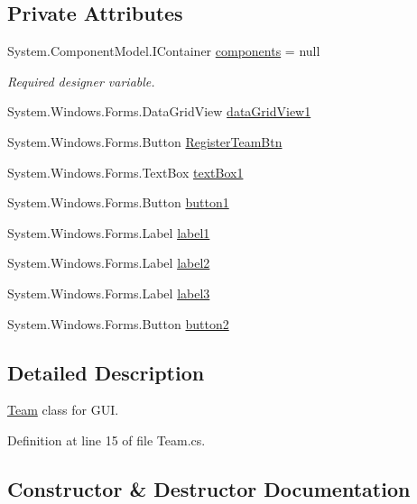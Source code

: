 \subsection*{Private Attributes}
\begin{DoxyCompactItemize}
\item 
System.\+Component\+Model.\+I\+Container \hyperlink{classPCO_1_1__0_1_1TeamForm_ab5e42668f793e518fe0615bc55ed7cb7}{components} = null
\begin{DoxyCompactList}\small\item\em Required designer variable. \end{DoxyCompactList}\item 
System.\+Windows.\+Forms.\+Data\+Grid\+View \hyperlink{classPCO_1_1__0_1_1TeamForm_a8c2297c2bcd76960ace971955c22284f}{data\+Grid\+View1}
\item 
System.\+Windows.\+Forms.\+Button \hyperlink{classPCO_1_1__0_1_1TeamForm_a77ddf05e8808fb4acf9c781dd7ac1758}{Register\+Team\+Btn}
\item 
System.\+Windows.\+Forms.\+Text\+Box \hyperlink{classPCO_1_1__0_1_1TeamForm_a6c0b69087c958e097e8383236d2470e2}{text\+Box1}
\item 
System.\+Windows.\+Forms.\+Button \hyperlink{classPCO_1_1__0_1_1TeamForm_aeba5f7ade710aabac05af33ab5397254}{button1}
\item 
System.\+Windows.\+Forms.\+Label \hyperlink{classPCO_1_1__0_1_1TeamForm_a0bf7f9e939cb4bea2abbcf798ff1d074}{label1}
\item 
System.\+Windows.\+Forms.\+Label \hyperlink{classPCO_1_1__0_1_1TeamForm_afd83d97a24a823e05306786f062bf285}{label2}
\item 
System.\+Windows.\+Forms.\+Label \hyperlink{classPCO_1_1__0_1_1TeamForm_a7172b2a0037432d76865266b1c33eca9}{label3}
\item 
System.\+Windows.\+Forms.\+Button \hyperlink{classPCO_1_1__0_1_1TeamForm_a15e74530591d8c6cbb7cf9d012e57dee}{button2}
\end{DoxyCompactItemize}


\subsection{Detailed Description}
\hyperlink{classTeam}{Team} class for G\+UI. 

Definition at line 15 of file Team.\+cs.



\subsection{Constructor \& Destructor Documentation}
\mbox{\label{classPCO_1_1__0_1_1TeamForm_a0db8eadd490077e3330e0254ccdc1cee}} 
